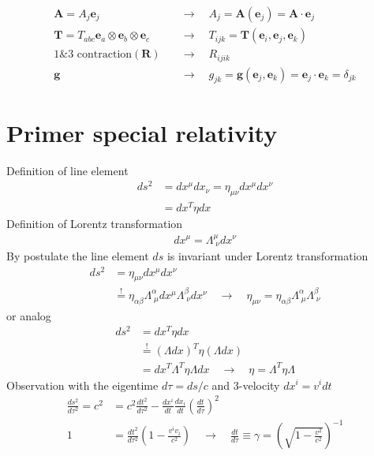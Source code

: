 \documentclass[10pt,a4paper]{book}
\theoremstyle{definition}
\begin{document}
\begin{itemize}
\begin{align}
    \mathbf{A}=A_j\mathbf{e}_j\quad&\rightarrow\quad A_j=\mathbf{A}(\mathbf{e}_j)=\mathbf{A}\cdot\mathbf{e}_j\\
    \mathbf{T}=T_{abc}\mathbf{e}_a\otimes\mathbf{e}_b\otimes\mathbf{e}_c\quad&\rightarrow\quad T_{ijk}=\mathbf{T}(\mathbf{e}_i,\mathbf{e}_j,\mathbf{e}_k)\\
    \text{1\&3 contraction}(\mathbf{R})\quad&\rightarrow\quad R_{ijik}\\
    \mathbf{g}\quad&\rightarrow\quad g_{jk}=\mathbf{g}(\mathbf{e}_j,\mathbf{e}_k)=\mathbf{e}_j\cdot\mathbf{e}_k=\delta_{jk}
\end{align}
\end{itemize}


\newpage
\chapter{Primer special relativity}
Definition of line element
\begin{align}
    ds^2 &= dx^\mu dx_\nu = \eta_{\mu\nu}dx^\mu dx^\nu\\
        &= dx^T\eta dx
\end{align}
Definition of Lorentz transformation
\begin{align}
    dx^\mu = \Lambda^\mu_{\;\nu}dx^\nu
\end{align}
By postulate the line element $ds$ is invariant under Lorentz transformation
\begin{align}
    ds^2 &= \eta_{\mu\nu}dx^\mu dx^\nu\\
    &\stackrel{!}{=} \eta_{\alpha\beta}\Lambda^\alpha_{\;\mu}dx^\mu \Lambda^\beta_{\;\nu}dx^\nu\quad\rightarrow\quad \eta_{\mu\nu} = \eta_{\alpha\beta}\Lambda^\alpha_{\;\mu} \Lambda^\beta_{\;\nu}
\end{align}
or analog
\begin{align}
    ds^2 &= dx^T\eta dx\\
    &\stackrel{!}{=} (\Lambda dx)^T\eta (\Lambda dx)\\
    &= dx^T\Lambda^T\eta \Lambda dx\quad\rightarrow\quad \eta = \Lambda^T\eta\Lambda
\end{align}
Observation with the eigentime $d\tau=ds/c$ and 3-velocity $dx^i = v^i dt$
\begin{align}
    \frac{ds^2}{d\tau^2}=c^2&=c^2\frac{dt^2}{d\tau^2}-\frac{dx^i}{dt}\frac{dx_i}{dt}\left(\frac{dt}{d\tau}\right)^2\\
    1&=\frac{dt^2}{d\tau^2}\left(1-\frac{v^iv_i}{c^2}\right)\quad\rightarrow\quad\frac{dt}{d\tau}\equiv\gamma=\left(\sqrt{1-\frac{v^2}{c^2}}\right)^{-1}
\end{align}
\end{document}
